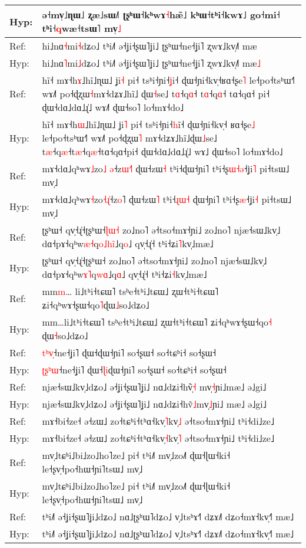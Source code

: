\documentclass[10pt]{article}
\DeclareRobustCommand{\hl}[1]{{\textcolor{red}{#1}}}
\begin{document}
\begin{longtable}{ll}
Hyp: & ə˧mv̩˩ɳɯ˩ ʐæ˩sɯ˩˥ ʈʂʰɯ˧kʰwɤ\hl{˧}hæ̃˩ kʰɯ˧tʰi˧kwɤ˩ go˧mi˧ tʰi˧\hl{q}wæ˧tsɯ˥ mv̩\hl{˩} \\ 
\midrule 
Ref: & hi˩nɑ\hl{˧}mi\hl{˧}dʑo˩ tʰi˩˥ ə˧ʝi˧ʂɯ˥ʝi˩ ʈʂʰɯ˧ne˧ʝi˥ ʐwɤ˩kv̩˩˥ mæ \\ 
Hyp: & hi˩nɑ\hl{˥}mi\hl{˩}dʑo˩ tʰi˩˥ ə˧ʝi˧ʂɯ˥ʝi˩ ʈʂʰɯ˧ne˧ʝi˥ ʐwɤ˩kv̩˩˥ mæ\hl{˩} \\ 
\midrule 
Ref: & hĩ˧ mɤ˧h\hl{ɤ}˩hĩ˩ɳɯ˩ ʝi\hl{˧} pi˧ tsʰi˧ɲi˧\hl{ʝ}i˧ ɖɯ˧ɲi˧kv̩˧ʁɑ˧ʂe\hl{˥} le˧po˧tsʰɯ˧˥ wɤ˩˥ po˧ɖʐɯ\hl{˧}mɤ˧dʑɤ˩hĩ˩\hl{ }ɖɯ\hl{˧}se˩ t\hl{ɑ}˧q\hl{ɑ}˧\hl{ }t\hl{ɑ}˧q\hl{ɑ}˧\hl{ }tɑ˧qɑ˧\hl{ }pi˧ ɖɯ˧dɑ˩dɑ˩ɻ̍˩ wɤ˩\hl{˥} ɖɯ˧so˥ lo˧mɤ˧do˩ \\ 
Hyp: & hĩ˧ mɤ˧h\hl{ɯ}˩hĩ˩ɳɯ˩ ʝi\hl{˥} pi˧ tsʰi˧ɲi˧\hl{h}i\hl{̃}˧ ɖɯ˧ɲi˧kv̩˧\hl{ }ʁɑ˧ʂe\hl{˩} le˧po˧tsʰɯ˧˥ wɤ˩˥ po˧ɖʐɯ\hl{˥}\hl{ }mɤ˧dʑɤ˩hĩ˩ɖɯ\hl{˩}se˩ t\hl{æ}˧q\hl{æ}˧t\hl{æ}˧q\hl{æ}˧tɑ˧qɑ˧pi˧ ɖɯ˧dɑ˩dɑ˩ɻ̍˩ wɤ˩ ɖɯ˧so˥ lo˧mɤ˧do˩ \\ 
\midrule 
Ref: & mɤ˧dɑ˩qʰwɤ\hl{˩}zo\hl{˩}\hl{ }\hl{ə}˧z\hl{ɯ}\hl{˧}˥ ɖɯ˧zɯ\hl{˧} tʰi˧ɖɯ˧ɲi˥ tʰi˧ʂ\hl{ɯ}\hl{˧}\hl{ə}˧ʝi\hl{˥} pi˧tsɯ˩ mv̩˩ \\ 
Hyp: & mɤ˧dɑ˩qʰwɤ\hl{˧}zo\hl{˧}\hl{ɻ}\hl{̍}˧z\hl{o}˥ ɖɯ˧zɯ\hl{˥} tʰi˧\hl{ɻ}\hl{ɯ}\hl{˧}\hl{ }ɖɯ˧ɲi˥ tʰi˧ʂ\hl{æ}˧ʝi\hl{˧} pi˧tsɯ˩ mv̩˩ \\ 
\midrule 
Ref: & ʈʂʰɯ˧ qv̩˧ɻ̍˧ʈʂʰɯ˧\hl{ɭ}\hl{ɯ}\hl{˧} zo˩no˥ ə˧tso˧mɤ˧ɲi˩ zo˩no˥ njæ˧sɯ˩kv̩˩ dɑ˧pɤ˧qʰw\hl{æ}\hl{˧}q\hl{o}\hl{˩}\hl{h}\hl{i}\hl{̃}˩q\hl{o}˩ qv̩˧ɻ̍˧ tʰi˧ʑi\hl{˥}kv̩˩mæ˩ \\ 
Hyp: & ʈʂʰɯ˧ qv̩˧ɻ̍˧ʈʂʰɯ˧ zo˩no˥ ə˧tso˧mɤ˧ɲi˩ zo˩no˥ njæ˧sɯ˩kv̩˩ dɑ˧pɤ˧qʰw\hl{ɤ}\hl{˥}q\hl{w}\hl{ɑ}˩q\hl{ɑ}˩ qv̩˧ɻ̍˧ tʰi˧ʑi\hl{˧}kv̩˩mæ˩ \\ 
\midrule 
Ref: & mm\hl{m}…\hl{ }li˩tʰi˧tɕɯ˥ tsʰe˧tʰi˩tɕɯ˩ ʐɯ˧tʰi˧tɕɯ˥ ʑi˧qʰwɤ˧ʂɯ˧qo\hl{˥}ɖɯ\hl{˩}so˩dʑo˩ \\ 
Hyp: & mm…li˩tʰi˧tɕɯ˥ tsʰe˧tʰi˩tɕɯ˩ ʐɯ˧tʰi˧tɕɯ˥ ʑi˧qʰwɤ˧ʂɯ˧qo\hl{˧}\hl{ }ɖɯ\hl{˧}so˩dʑo˩ \\ 
\midrule 
Ref: & \hl{t}\hl{ʰ}\hl{v}\hl{̩}˧ne˧ʝi˥ ɖɯ˧ɖɯ˧ɲi˥ so˧ʂɯ˧ so˧tɕʰi˧ so˧ʂɯ˧ \\ 
Hyp: & \hl{ʈ}\hl{ʂ}\hl{ʰ}\hl{ɯ}˧ne˧ʝi˥ ɖɯ˧\hl{ɭ}\hl{i}ɖɯ˧ɲi˥ so˧ʂɯ˧ so˧tɕʰi˧ so˧ʂɯ˧ \\ 
\midrule 
Ref: & njæ˧sɯ˩kv̩˩dʑo˩ ə˧ʝi˧ʂɯ˥ʝi˩ nɑ˩dʑi˧hṽ\hl{̩}\hl{˧}\hl{ }mv̩\hl{˧}ɲi˩mæ˩ ə˩gi˩ \\ 
Hyp: & njæ˧sɯ˩kv̩˩dʑo˩ ə˧ʝi˧ʂɯ˥ʝi˩ nɑ˩dʑi˧hṽ\hl{˩}mv̩\hl{˩}ɲi˩\hl{ }mæ˩ ə˩gi˩ \\ 
\midrule 
Ref: & mɤ˧bi˧ze˧ ə˧zɯ˩ zo˧tɕʰi˧tʰɑ˧kv̩\hl{˥}kv̩\hl{˩} ə˧tso˧mɤ˧ɲi˩ tʰi˧di˩ze˩ \\ 
Hyp: & mɤ˧bi˧ze˧ ə˧zɯ˩ zo˧tɕʰi˧tʰɑ˧kv̩\hl{˧}kv̩\hl{˥} ə˧tso˧mɤ˧ɲi˩ tʰi˧di˩ze˩ \\ 
\midrule 
Ref: & mv̩˩tɕʰi˩bi˩zo˩ho˥ze˩ pi˧ tʰi˩˥ mv̩˩zo˩˥ ɖɯ˧ɭɯ˧ki˧ le˧ʂv̩˧po˧hɯ˧ɲi˥tsɯ˩ mv̩˩ \\ 
Hyp: & mv̩˩tɕʰi˩bi˩zo˩ho˥ze˩ pi˧ tʰi˩˥ mv̩˩zo˩˥ ɖɯ˧ɭɯ˧ki˧ le˧ʂv̩˧po˧hɯ˧ɲi˥tsɯ˩ mv̩˩ \\ 
\midrule 
Ref: & tʰi˩˥ ə˧ʝi˧ʂɯ˥ʝi˩dʑo˩ nɑ˩ʈʂʰɯ˥dʑo˩ v̩˩tsʰɤ˧˥ dʑɤ˩˥ dʑo˧mɤ˧kv̩˧˥ mæ˩ \\ 
Hyp: & tʰi˩˥ ə˧ʝi˧ʂɯ˥ʝi˩dʑo˩ nɑ˩ʈʂʰɯ˥dʑo˩ v̩˩tsʰɤ˧˥ dʑɤ˩˥ dʑo˧mɤ˧kv̩˧˥ mæ˩ \\ 
\midrule 
\end{longtable}
\end{document}
